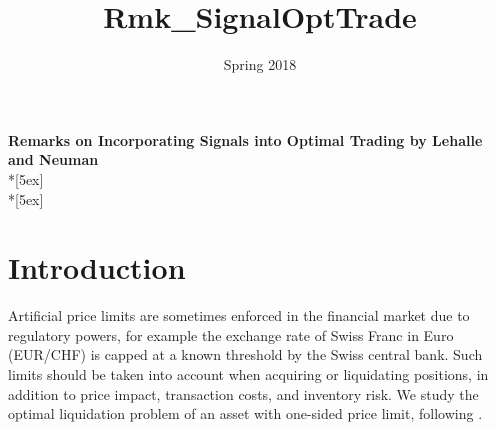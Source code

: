 \documentclass[openany,oneside]{article}
\title{Rmk_SignalOptTrade}
\date{Spring 2018}
\theoremstyle{definition}
\theoremstyle{remark}
\begin{document}
\begin{center}	
	\textbf{\Large Remarks on Incorporating Signals into Optimal Trading by Lehalle and Neuman} \\*[5ex]
    \thedate \\*[5ex]
\end{center}


\section{Introduction}
Artificial price limits are sometimes enforced in the financial market due to regulatory powers, for example the exchange rate of Swiss Franc in Euro (EUR/CHF) is capped at a known threshold by the Swiss central bank. Such limits should be taken into account when acquiring or liquidating positions, in addition to price impact, transaction costs, and inventory risk. We study the optimal liquidation problem of an asset with one-sided price limit, following \cite{lehalle2017incorporating}.


\end{document}
